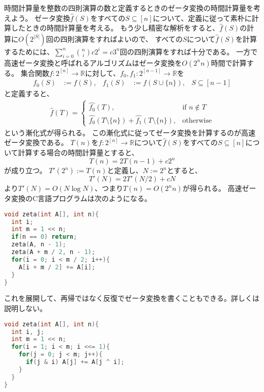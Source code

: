 \documentclass[a4paper,twoside,onecolumn,openany,article,10pt]{memoir}
\theoremstyle{definition}
\theoremstyle{remark}
\begin{document}
時間計算量を整数の四則演算の数と定義するときのゼータ変換の時間計算量を考えよう。
ゼータ変換$\widehat{f}(S)$をすべての$S\subseteq[n]$について、定義に従って素朴に計算したときの時間計算量を考える。
もう少し精密な解析をすると、$\widehat{f}(S)$の計算に$O(2^{|S|})$回の四則演算をすればよいので、
すべての$S$について$\widehat{f}(S)$を計算するためには、$\sum_{i=0}^n\binom{n}{i}c 2^i=c 3^n$回の四則演算をすれば十分である。
一方で高速ゼータ変換と呼ばれるアルゴリズムはゼータ変換を$O(2^n n)$時間で計算する。
集合関数$f\colon 2^{[n]}\to\mathbb{R}$に対して、$f_0, f_1\colon 2^{[n-1]}\to\mathbb{R}$を
\begin{align*}
f_0(S) &:= f(S), & f_1(S) &:= f(S\cup\{n\}),& S\subseteq[n-1]
\end{align*}
と定義すると、
\begin{align*}
\widehat{f}(T) =
\begin{cases}
\widehat{f_0}(T),&\text{if } n\notin T\\
\widehat{f_0}(T\setminus\{n\})+\widehat{f_1}(T\setminus\{n\}),&\text{otherwise}
\end{cases}
\end{align*}
という漸化式が得られる。
この漸化式に従ってゼータ変換を計算するのが高速ゼータ変換である。
$T(n)$を$f\colon 2^{[n]}\to\mathbb{R}$について$\widehat{f}(S)$をすべての$S\subseteq[n]$について計算する場合の時間計算量とすると、
\begin{equation*}
T(n) = 2T(n-1) + c2^n
\end{equation*}
が成り立つ。
$T'(2^n):=T(n)$と定義し、$N:=2^n$とすると、
\begin{equation*}
T'(N) = 2T'(N/2) + cN
\end{equation*}
より$T'(N) = O(N\log N)$、つまり$T(n) = O(2^n n)$が得られる。
高速ゼータ変換のC言語プログラムは次のようになる。
\begin{lstlisting}[basicstyle=\ttfamily\normalsize,showstringspaces=false,language=C,frame=single]
void zeta(int A[], int n){
  int i;
  int m = 1 << n;
  if(n == 0) return;
  zeta(A, n - 1);
  zeta(A + m / 2, n - 1);
  for(i = 0; i < m / 2; i++){
    A[i + m / 2] += A[i];
  }
}
\end{lstlisting}
これを展開して、再帰ではなく反復でゼータ変換を書くこともできる。詳しくは説明しない。
\begin{lstlisting}[basicstyle=\ttfamily\normalsize,showstringspaces=false,language=C,frame=single]
void zeta(int A[], int n){
  int i, j;
  int m = 1 << n;
  for(i = 1; i < m; i <<= 1){
    for(j = 0; j < m; j++){
      if(j & i) A[j] += A[j ^ i];
    }
  }
}
\end{lstlisting}
\end{document}
